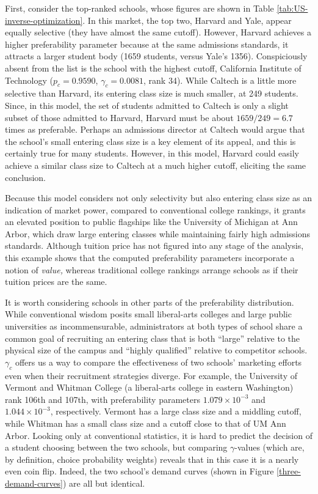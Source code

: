 \documentclass[12pt]{article}
\numberwithin{equation}{subsection}
\theoremstyle{definition}
\begin{document}
First, consider the top-ranked schools, whose figures are shown in Table \ref{tab:US-inverse-optimization}. In this market, the top two, Harvard and Yale, appear equally selective (they have almost the same cutoff). However, Harvard achieves a higher preferability parameter because at the same admissions standards, it attracts a larger student body (1659 students, versus Yale's 1356). Conspiciously absent from the list is the school with the highest cutoff, California Institute of Technology ($p_c = 0.9590$, $\gamma_c = 0.0081$, rank 34). While Caltech is a little more selective than Harvard, its entering class size is much smaller, at 249 students. Since, in this model, the set of students admitted to Caltech is only a slight subset of those admitted to Harvard, Harvard must be about $1659 / 249 = 6.7$ times as preferable. Perhaps an admissions director at Caltech would argue that the school's small entering class size is a key element of its appeal, and this is certainly true for many students. However, in this model, Harvard could easily achieve a similar class size to Caltech at a much higher cutoff, eliciting the same conclusion.

 Because this model considers not only selectivity but also entering class size as an indication of market power, compared to conventional college rankings, it grants an elevated position to public flagships like the University of Michigan at Ann Arbor, which draw large entering classes while maintaining fairly high admissions standards. Although tuition price has not figured into any stage of the analysis, this example shows that the computed preferability parameters incorporate a notion of \emph{value,} whereas traditional college rankings arrange schools as if their tuition prices are the same.

It is worth considering schools in other parts of the preferability distribution. While conventional wisdom posits small liberal-arts colleges and large public universities as incommensurable, administrators at both types of school share a common goal of recruiting an entering class that is both ``large'' relative to the physical size of the campus and ``highly qualified'' relative to competitor schools. $\gamma_c$ offers us a way to compare the effectiveness of two schools' marketing efforts even when their recruitment strategies diverge. For example, the University of Vermont and Whitman College (a liberal-arts college in eastern Washington) rank 106th and 107th, with preferability parameters $1.079 \times 10^{-3}$ and $1.044 \times 10^{-3}$, respectively. Vermont has a large class size and a middling cutoff, while Whitman has a small class size and a cutoff close to that of UM Ann Arbor. Looking only at conventional statistics, it is hard to predict the decision of a student choosing between the two schools, but comparing $\gamma$-values (which are, by definition, choice probability weights) reveals that in this case it is a nearly even coin flip. Indeed, the two school's demand curves (shown in Figure \ref{three-demand-curves}) are all but identical. 
\end{document}
